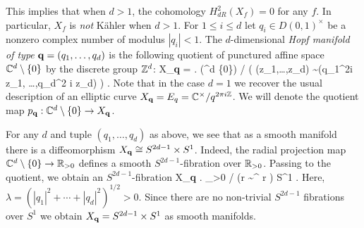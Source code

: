 \documentclass[10pt]{amsart}
\begin{document}
This implies that when $d > 1$, the cohomology $H^{2}_{dR} (X_f) = 0$ for any $f$. 
In particular, $X_f$ is {\em not} K\"{a}hler when $d > 1$. 
For $1 \leq i \leq d$ let $q_i \in D(0,1)^{\times}$ be a nonzero complex number of modulus $|q_i| <1$. 
The $d$-dimensional {\em Hopf manifold of type} ${\bf q} = (q_1,\ldots,q_d)$ is the following quotient of punctured affine space $\mathbb C^d \setminus \{0\}$ by the discrete group $\mathbb Z^d$:
\ben
X_{\bf q} = \left. \left(\CC^d \setminus \{0\}\right) \right/ \left( (z_1,\ldots,z_d) \sim (q_1^{2\pi i \ZZ} z_1, \ldots,q_d^{2 \pi i \ZZ} z_d) \right) .
\een
Note that in the case $d = 1$ we recover the usual description of an elliptic curve $X_{\bf q} = E_q = \mathbb C^\times / q^{2 \pi i \mathbb Z}$. 
We will denote the quotient map $p_{\bf q} : \mathbb C^d \setminus \{0\} \to X_{\bf q}$. 

For any $d$ and tuple $(q_1,\ldots, q_d)$ as above, we see that as a smooth manifold there is a diffeomorphism $X_{\bf q} \cong S^{2d-1} \times S^1$. 
Indeed, the radial projection map $\mathbb C^d \setminus \{0\} \to \mathbb R_{>0}$ defines a smooth $S^{2d-1}$-fibration over $\mathbb R_{>0}$. 
Passing to the quotient, we obtain an $S^{2d - 1}$-fibration 
\ben
X_{\bf q} \to \left. \RR_{>0} \right/ \left(r \sim \lambda^{\ZZ} \cdot r \right) \cong S^1 .
\een
Here, $\lambda = (|q_1|^2 + \cdots + |q_d|^2)^{1/2} > 0$. 
Since there are no non-trivial $S^{2d-1}$ fibrations over $S^1$ we obtain $X_{\bf q} = S^{2d-1} \times S^1$ as smooth manifolds. 
\end{document}
